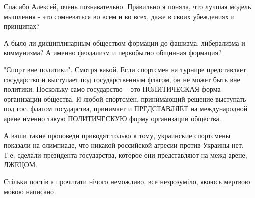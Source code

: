 \begin{itemize}
 

Спасибо Алексей, очень познавательно. Правильно я поняла, что лучшая модель
мышления - это сомневаться во всем и во всех, даже в своих убеждениях и
принципах?


 

А было ли дисциплинарным обществом формации до фашизма, либерализма и
коммунизма? А именно феодализм и первобытно общинная формация?

 

"Спорт вне политики". Смотря какой. Если спортсмен на турнире представляет
государство и выступает под государственным флагом, он не может быть вне
политики. Поскольку само государство – это ПОЛИТИЧЕСКАЯ форма организации
общества. И любой спортсмен, принимающий решение выступать под гос. флагом
государства, принимает и ПРЕДСТАВЛЯЕТ на международной арене именно такую
ПОЛИТИЧЕСКУЮ форму организации общества.

А ваши такие проповеди приводят только к тому, украинские спортсмены показали
на олимпиаде, что никакой российской агресии против Украины нет. Т.е. сделали
президента государства, которое они представляют на межд арене, ЛЖЕЦОМ.


 
Стільки постів а прочитати нічого неможливо, все незрозуміло, якоюсь мертвою
мовою написано🤔


 


\end{itemize}
